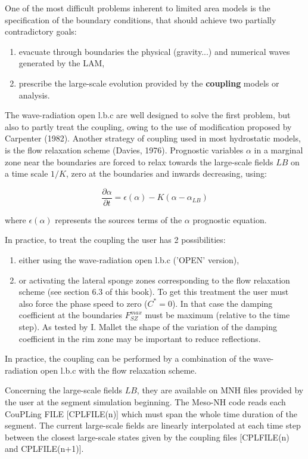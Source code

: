 One of the most difficult problems inherent to limited area models is the
specification of the boundary conditions, that should achieve
two partially contradictory goals:

\begin{enumerate}
\item evacuate through boundaries the physical (gravity...) and numerical
waves generated by the LAM,
\item prescribe the large-scale evolution provided by the {\bf coupling}
models or analysis.
\end{enumerate}

 The wave-radiation open l.b.c are well designed to solve the first problem,
but also to partly treat the coupling, owing to the use of modification proposed by
Carpenter (1982). Another strategy of coupling used in most hydrostatic models,
is the flow relaxation scheme (Davies, 1976). Prognostic variables $\alpha$ in
a marginal zone near the boundaries are forced to relax towards the large-scale
fields $LB$ on a time scale $1/K$, zero at the boundaries and inwards decreasing,
using:

\begin{equation}
  \dfrac{\partial \alpha}{\partial t} =
 \epsilon (\alpha) - K (\alpha - \alpha_{LB})
\end{equation}

\noindent
where $\epsilon (\alpha)$ represents the sources terms of the $\alpha$ prognostic
equation.

 In practice, to treat the coupling the user has 2 possibilities:
\begin{enumerate}
\item either using the wave-radiation open l.b.c ('OPEN' version),
\item or activating the lateral sponge zones corresponding to the flow
relaxation scheme (see section 6.3 of this book). To get this treatment
the user must also force the phase speed to zero ($C^* = 0$).
 In that case the damping
coefficient at the boundaries $F_{SZ}^{max}$ must be maximum (relative to the
time step). As tested by I. Mallet the shape of the variation of the damping
coefficient in the rim zone may be important to reduce reflections.
\end{enumerate}

 In practice, the coupling can be performed by a combination of the
wave-radiation open l.b.c with the flow relaxation scheme.

 Concerning the large-scale fields $LB$, they are available on MNH files provided by
the user at the segment simulation beginning. The Meso-NH code reads each CouPLing
FILE [CPLFILE(n)] which must span the whole time duration of the segment.
The current large-scale fields are linearly interpolated at each
time step between the closest large-scale states given by the coupling files
[CPLFILE(n) and CPLFILE(n+1)].


